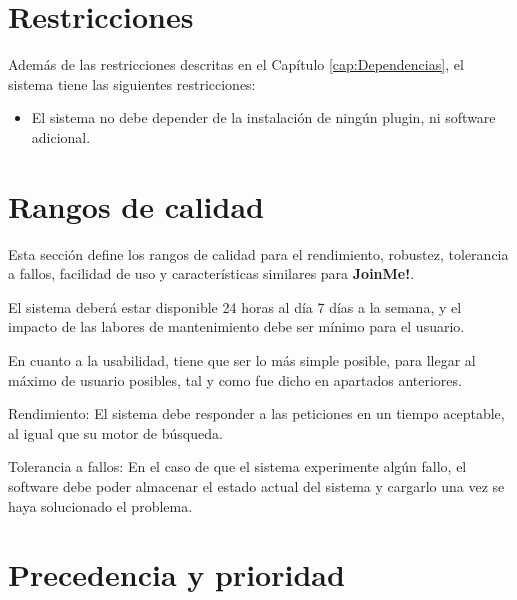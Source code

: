 \documentclass[12pt, a4paper, titlepage]{article}
\begin{document}
\section{Restricciones}


Además de las restricciones descritas en el Capítulo \ref{cap:Dependencias}, el sistema tiene las siguientes restricciones:
\begin{itemize}
\item El sistema no debe depender de la instalación de ningún plugin, ni software adicional.

\end{itemize}

\section{Rangos de calidad}

Esta sección define los rangos de calidad para el rendimiento, robustez, tolerancia a
fallos, facilidad de uso y características similares para \textbf{JoinMe!}.

El sistema deberá estar disponible 24 horas al día 7 días a la semana, y el impacto de las labores de mantenimiento debe ser mínimo para el usuario.

En cuanto a la usabilidad, tiene que ser lo más simple posible, para llegar al máximo de usuario posibles, tal y como fue dicho en apartados anteriores. 

Rendimiento: El sistema debe responder a las peticiones en un tiempo aceptable, al igual que su motor de búsqueda.

Tolerancia a fallos: En el caso de que el sistema experimente algún fallo, el software debe poder 
almacenar el estado actual del sistema y cargarlo una vez se haya solucionado
el problema.



\section{Precedencia y prioridad}
\end{document}
